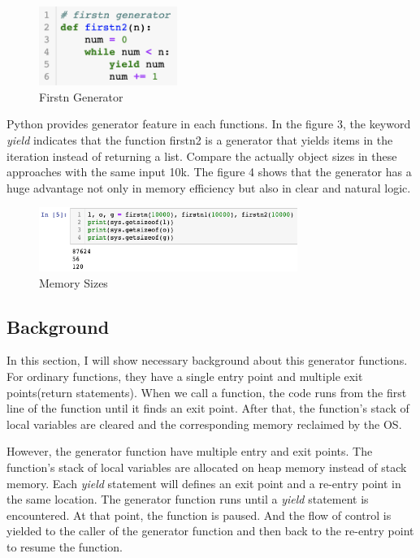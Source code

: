 %
\begin{figure}[H]
	\centering
	\includegraphics[width=0.4\textwidth]{figures/fstn2}
	\caption{Firstn Generator}
\end{figure}
%

Python provides generator feature in each functions. In the figure 3, the keyword \textit{yield} indicates that the function firstn2 is a generator that yields items in the iteration instead of returning a list. Compare the actually object sizes in these approaches with the same input 10k. The figure 4 shows that the generator has a huge advantage not only in memory efficiency but also in clear and natural logic. 

%
\begin{figure}[H]
	\centering
	\includegraphics[width=0.75\textwidth]{figures/memsize}
	\caption{Memory Sizes}
\end{figure}
%

\subsection{Background}
In this section, I will show necessary background about this generator functions. For ordinary functions, they have a single entry point and multiple exit points(return statements). When we call a function, the code runs from the first line of the function until it finds an exit point. After that, the function's stack of local variables are cleared and the corresponding memory reclaimed by the OS\cite{magic}.

However, the generator function have multiple entry and exit points. The function's stack of local variables are allocated on heap memory instead of stack memory. Each \textit{yield} statement will defines an exit point and a re-entry point in the same location. The generator function runs until a \textit{yield} statement is encountered. At that point, the function is paused. And the flow of control is yielded to the caller of the generator function and then back to the re-entry point to resume the function. 

